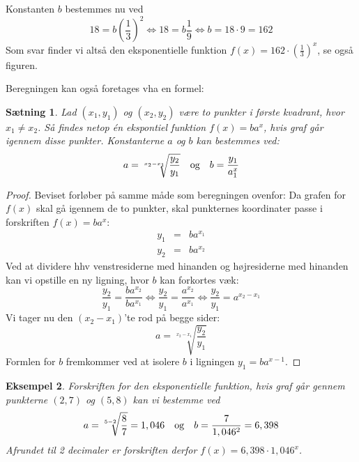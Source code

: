 \documentclass[12pt,oneside,a4paper]{article}
\newcommand{\bas}{\begin{eqnarray*}}
\newcommand{\eas}{\end{eqnarray*}}
\newtheorem{thm}{Sætning}[section]
\newtheorem{eks}[thm]{Eksempel}
\begin{document}
Konstanten $b$ bestemmes nu ved
$$
18 = b \left(\frac{1}{3}\right)^2  \Leftrightarrow
18 = b \frac{1}{9}  \Leftrightarrow
b = 18\cdot 9 = 162 
$$
Som svar finder vi altså den eksponentielle funktion $f(x) = 162\cdot \left(\frac{1}{3}\right)^x$, se også figuren.

Beregningen kan også foretages vha en formel:
\begin{thm}
    Lad $(x_1,y_1)$ og $(x_2,y_2)$ være to punkter i første kvadrant, hvor $x_1
    \neq x_2$. Så findes netop én ekspontiel funktion $f(x) = b a^x$, hvis graf går igennem disse punkter.
    Konstanterne $a$ og $b$ kan bestemmes ved:
    $$
    a = \sqrt[x_2-x_1]{\frac{y_2}{y_1}} \quad \hbox{og} \quad b = \frac{y_1}{a^x_1}
    $$
\end{thm}
\begin{proof}
    Beviset forløber på samme måde som beregningen ovenfor: Da grafen for $f(x)$ skal gå igennem de to punkter,
    skal punkternes koordinater passe i forskriften $f(x) = ba^x$:
    \bas
    y_1 &=& b a^{x_1} \\
    y_2 &=& b a^{x_2}
    \eas
    Ved at dividere hhv venstresiderne med hinanden og højresiderne med hinanden kan vi opstille en ny ligning,
    hvor $b$ kan forkortes væk:
    $$
    \frac{y_2}{y_1} = \frac{b a^{x_2}}{b a^{x_1}} \Leftrightarrow
    \frac{y_2}{y_1} = \frac{a^{x_2}}{a^{x_1}} \Leftrightarrow
    \frac{y_2}{y_1} = a^{x_2-x_1} 
    $$
    Vi tager nu den $(x_2-x_1)$'te rod på begge sider:
    $$
    a = \sqrt[x_2-x_1]{\frac{y_2}{y_1}}
    $$
    Formlen for $b$ fremkommer ved at isolere $b$ i ligningen $y_1 = b a^{x-1}$.
\end{proof}

\begin{eks}
    Forskriften for den eksponentielle funktion, hvis graf går gennem punkterne $(2, 7)$ og $(5, 8)$ kan vi bestemme ved
    $$
    a = \sqrt[5-2]{\frac{8}{7}} = 1,046 \quad \hbox{og} \quad b = \frac{7}{1,046^2} = 6,398
    $$
    Afrundet til 2 decimaler er forskriften derfor $f(x) = 6,398 \cdot 1,046^x$.
\end{eks}
\end{document}
